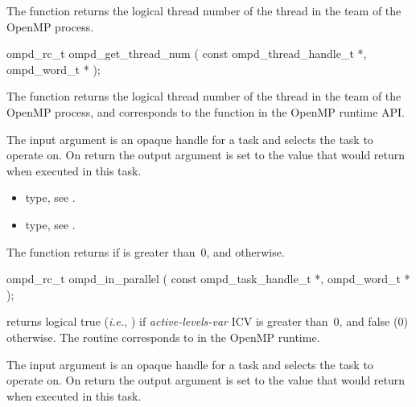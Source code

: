 \label{ompd:ompd_get_thread_num}
\summary
The  function returns the logical thread number of the thread in the team of the OpenMP process.

\format
\begin{cspecific}
\begin{ompSyntax}
ompd_rc_t ompd_get_thread_num (
  const ompd_thread_handle_t *,
  ompd_word_t *
);
\end{ompSyntax}
\end{cspecific}

\descr
The  function returns the logical thread number of the thread in the team of the OpenMP process, and
corresponds to the  function in the OpenMP runtime API.


\argdesc
The input argument  is an opaque handle for a task and selects the task to operate on.
On return the output argument  is set to the value that  would return when
executed in this task.

\crossreferences
\begin{itemize}
	\item {} type, see .
	\item {} type, see .
\end{itemize}


\label{ompd:ompd_in_parallel}
\summary
The  function returns  if  is greater than~0, and  otherwise.

\format
\begin{cspecific}
\begin{ompSyntax}
ompd_rc_t ompd_in_parallel (
  const ompd_task_handle_t *,
  ompd_word_t *
);
\end{ompSyntax}
\end{cspecific}

\descr
{} returns logical true (\textit{i.e.}, )
if \emph{active-levels-var}
ICV is greater than~0, and false (0) otherwise.
The routine corresponds to  in the OpenMP runtime.

\argdesc
The input argument  is an opaque handle for a task and selects the task to operate on.
On return the output argument  is set to the value that  would return when
executed in this task.

